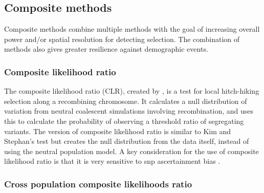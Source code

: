 \documentclass[twoside,openright]{report}
\begin{document}
\subsection{Composite methods}\label{composite-methods}

Composite methods combine multiple methods with the goal of increasing
overall power and/or spatial resolution for detecting selection. The
combination of methods also gives greater resilience against demographic
events.

\subsubsection{Composite likelihood
ratio}\label{composite-likelihood-ratio}

The composite likelihood ratio (CLR), created by \citet{Kim2002}, is a
test for local hitch-hiking selection along a recombining chromosome. It
calculates a null distribution of variation from neutral coalescent
simulations involving recombination, and uses this to calculate the
probability of observing a threshold ratio of segregating variants. The
\citet{Nielsen2005a} version of composite likelihood ratio is similar to
Kim and Stephan's test but creates the null distribution from the data
itself, instead of using the neutral population model. A key
consideration for the use of composite likelihood ratio is that it is
very sensitive to \gls{snp} ascertainment bias \citep{Chen2010}.

\subsubsection{Cross population composite likelihoods
ratio}\label{cross-population-composite-likelihoods-ratio}
\end{document}
